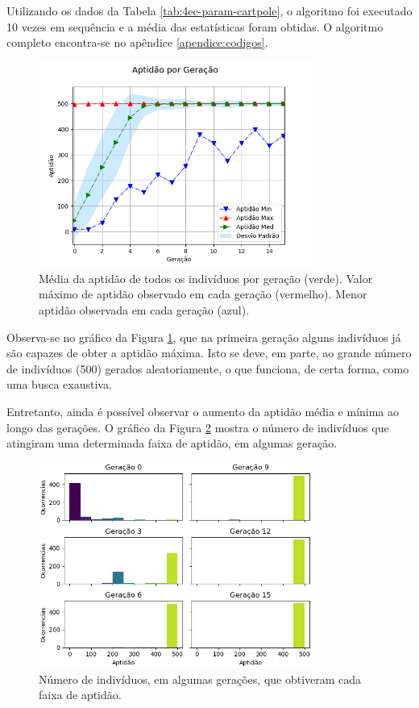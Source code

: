Utilizando os dados da Tabela \ref{tab:4ec-param-cartpole}, o algoritmo foi executado 10 vezes em sequência e a média das estatísticas foram obtidas. O algoritmo completo encontra-se no apêndice \ref{apendice:codigos}.

\begin{figure}[H]
	\centering
	\includegraphics[width=0.8\textwidth]{02_desenvolvimento/04_EC_Fig_CartpoleAptGer.png}
	\caption{Média da aptidão de todos os indivíduos por geração (verde). Valor máximo de aptidão observado em cada geração (vermelho). Menor aptidão observada em cada geração (azul).}
	\label{fig:4ec-cartpoleaptger}
\end{figure}

Observa-se no gráfico da Figura \ref{fig:4ec-cartpoleaptger}, que na primeira geração alguns indivíduos já são capazes de obter a aptidão máxima. Isto se deve, em parte, ao grande número de indivíduos (500) gerados aleatoriamente, o que funciona, de certa forma, como uma busca exaustiva.

Entretanto, ainda é possível observar o aumento da aptidão média e mínima ao longo das gerações. O gráfico da Figura \ref{fig:4ec-cartpoleapthist} mostra o número de indivíduos que atingiram uma determinada faixa de aptidão, em algumas geração.

\begin{figure}[H]
	\centering
	\includegraphics[width=0.8\textwidth]{02_desenvolvimento/04_EC_Fig_CartpoleAptHist.png}
	\caption{Número de indivíduos, em algumas gerações, que obtiveram cada faixa de aptidão.}
	\label{fig:4ec-cartpoleapthist}
\end{figure}


